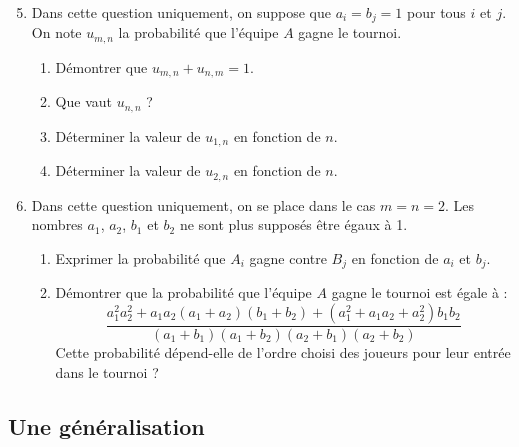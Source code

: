 \documentclass[landscape,twocolumn,leqno,a4paper,10pt]{report} %
\begin{document}
\begin{enumerate}\setcounter{enumi}{4}
	\item Dans cette question uniquement, on suppose que $a_{i}=b_{j}=1$ pour tous $i$ et $j$.\\
	On note $u_{m, n}$ la probabilité que l'équipe $A$ gagne le tournoi.
	\begin{enumerate}\vspace{-0.1cm}
		\item Démontrer que $u_{m, n}+u_{n, m}=1$.
		\item Que vaut $u_{n, n}$ ?
		\item Déterminer la valeur de $u_{1, n}$ en fonction de $n$.
		\item Déterminer la valeur de $u_{2, n}$ en fonction de $n$.
	\end{enumerate}\vspace{-0.1cm}
	\item Dans cette question uniquement, on se place dans le cas $m=n=2$. Les nombres $a_{1}$, $a_{2}$, $b_{1}$ et $b_{2}$ ne sont plus supposés être égaux à 1.
	\begin{enumerate}\vspace{-0.1cm}
		\item Exprimer la probabilité que $A_{i}$ gagne contre $B_{j}$ en fonction de $a_{i}$ et $b_{j}$.
		\item Démontrer que la probabilité que l'équipe $A$ gagne le tournoi est égale à :
		$$\frac{a_{1}^{2} a_{2}^{2}+a_{1} a_{2}\left(a_{1}+a_{2}\right)\left(b_{1}+b_{2}\right)+\left(a_{1}^{2}+a_{1} a_{2}+a_{2}^{2}\right) b_{1} b_{2}}{\left(a_{1}+b_{1}\right)\left(a_{1}+b_{2}\right)\left(a_{2}+b_{1}\right)\left(a_{2}+b_{2}\right)}$$
		Cette probabilité dépend-elle de l'ordre choisi des joueurs pour leur entrée dans le tournoi ?
	\end{enumerate}
\end{enumerate}

\newpage

\subsection{Une généralisation}
\end{document}
